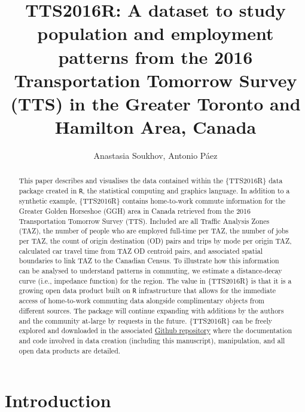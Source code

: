 \documentclass[Royal,times,sageh]{sagej}
\begin{document}

\title{TTS2016R: A dataset to study population and employment patterns
from the 2016 Transportation Tomorrow Survey (TTS) in the Greater
Toronto and Hamilton Area, Canada}

\runninghead{}

\author{Anastasia Soukhov\affilnum{}, Antonio Páez\affilnum{}}

\affiliation{\affilnum{}{}}



\begin{abstract}
This paper describes and visualises the data contained within the
\{TTS2016R\} data package created in \texttt{R}, the statistical
computing and graphics language. In addition to a synthetic example,
\{TTS2016R\} contains home-to-work commute information for the Greater
Golden Horseshoe (GGH) area in Canada retrieved from the 2016
Transportation Tomorrow Survey (TTS). Included are all Traffic Analysis
Zones (TAZ), the number of people who are employed full-time per TAZ,
the number of jobs per TAZ, the count of origin destination (OD) pairs
and trips by mode per origin TAZ, calculated car travel time from TAZ OD
centroid pairs, and associated spatial boundaries to link TAZ to the
Canadian Census. To illustrate how this information can be analysed to
understand patterns in commuting, we estimate a distance-decay curve
(i.e., impedance function) for the region. The value in \{TTS2016R\} is
that it is a growing open data product built on \texttt{R}
infrastructure that allows for the immediate access of home-to-work
commuting data alongside complimentary objects from different sources.
The package will continue expanding with additions by the authors and
the community at-large by requests in the future. \{TTS2016R\} can be
freely explored and downloaded in the associated
\href{https://github.com/soukhova/TTS2016R}{Github repository} where the
documentation and code involved in data creation (including this
manuscript), manipulation, and all open data products are detailed.
\end{abstract}


\maketitle

\hypertarget{introduction}{%
\section{Introduction}\label{introduction}}
\end{document}
